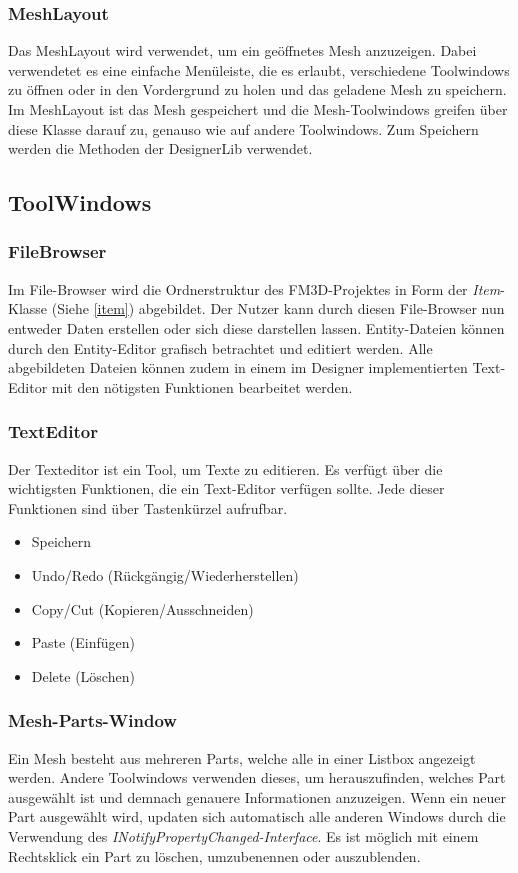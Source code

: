 \subsubsection{MeshLayout}
Das MeshLayout wird verwendet, um ein geöffnetes Mesh anzuzeigen. Dabei verwendetet es eine einfache Menüleiste, die es erlaubt, verschiedene Toolwindows zu öffnen oder in den Vordergrund zu holen und das geladene Mesh zu speichern. Im MeshLayout ist das Mesh gespeichert und die Mesh-Toolwindows greifen über diese Klasse darauf zu, genauso wie auf andere Toolwindows. Zum Speichern werden die Methoden der DesignerLib verwendet.

\subsection{ToolWindows}
\subsubsection{FileBrowser}
\label{filebrowser}
Im File-Browser wird die Ordnerstruktur des FM3D-Projektes in Form der \textit{Item}-Klasse (Siehe \cref{item}) abgebildet. Der Nutzer kann durch diesen File-Browser nun entweder Daten erstellen oder sich diese darstellen lassen. Entity-Dateien können durch den Entity-Editor grafisch betrachtet und editiert werden. Alle abgebildeten Dateien können zudem in einem im Designer implementierten Text-Editor mit den nötigsten Funktionen bearbeitet werden.

\subsubsection{TextEditor}
Der Texteditor ist ein Tool, um Texte zu editieren. Es verfügt über die wichtigsten Funktionen, die ein Text-Editor verfügen sollte. Jede dieser Funktionen sind über Tastenkürzel aufrufbar.
\begin{itemize}
	\item Speichern
	\item Undo/Redo (Rückgängig/Wiederherstellen)
	\item Copy/Cut (Kopieren/Ausschneiden)
	\item Paste (Einfügen)
	\item Delete (Löschen)
\end{itemize}

\subsubsection{Mesh-Parts-Window}
Ein Mesh besteht aus mehreren Parts, welche alle in einer Listbox angezeigt werden. Andere Toolwindows verwenden dieses, um herauszufinden, welches Part ausgewählt ist und demnach genauere Informationen anzuzeigen. Wenn ein neuer Part ausgewählt wird, updaten sich automatisch alle anderen Windows durch die Verwendung des \textit{INotifyPropertyChanged-Interface}. Es ist möglich mit einem Rechtsklick ein Part zu löschen, umzubenennen oder auszublenden.

